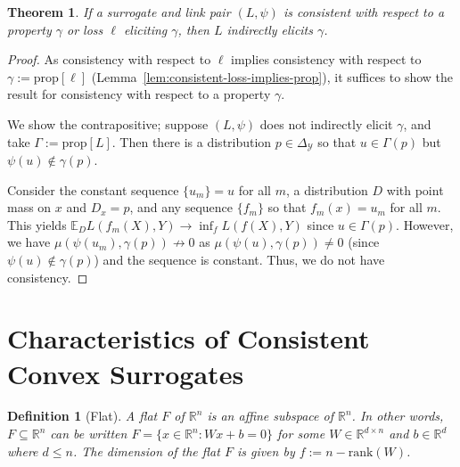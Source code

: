 \documentclass{article}
\newcommand{\reals}{\mathbb{R}}
\newcommand{\simplex}{\Delta_\Y}
\newcommand{\prop}[1]{\mathrm{prop}[#1]}
\newcommand{\E}{\mathbb{E}}
\newcommand{\Y}{\mathcal{Y}}
\newtheorem{theorem}{Theorem}
\newtheorem{definition}{Definition}
\begin{document}
\begin{theorem}\label{thm:consistent-implies-indir-elic}
	If a surrogate and link pair $(L, \psi)$ is consistent with respect to a property $\gamma$ or loss $\ell$ eliciting $\gamma$, then $L$ indirectly elicits $\gamma$.
\end{theorem}
\begin{proof}
	As consistency with respect to $\ell$ implies consistency with respect to $\gamma := \prop{\ell}$ (Lemma~\ref{lem:consistent-loss-implies-prop}), it suffices to show the result for consistency with respect to a property $\gamma$.
	
	We show the contrapositive; suppose $(L, \psi)$ does not indirectly elicit $\gamma$, and take $\Gamma := \prop{L}$.
	Then there is a distribution $p \in \simplex$ so that $u \in \Gamma(p)$ but $\psi(u) \not \in \gamma(p)$.

	Consider the constant sequence $\{u_m\} = u$ for all $m$, a distribution $D$ with point mass on $x$ and $D_x = p$, and any sequence $\{f_m\}$ so that $f_m(x) = u_m$ for all $m$.
	This yields $\E_D L(f_m(X), Y) \to \inf_f L(f(X),Y)$ since $u \in \Gamma(p)$.
	However, we have $\mu(\psi(u_m), \gamma(p)) \not \to 0$ as $\mu(\psi(u), \gamma(p)) \neq 0$ (since $\psi(u) \not \in \gamma(p)$) and the sequence is constant.
	Thus, we do not have consistency.
\end{proof}

\section{Characteristics of Consistent Convex Surrogates}\label{sec:char-convex}

\begin{definition}[Flat]
	A \emph{flat} $F$ of $\reals^n$ is an affine subspace of $\reals^n$.
	In other words, $F\subseteq \reals^n$ can be written $F=\{x\in\reals^n : Wx + b = 0\}$ for some $W\in\reals^{d\times n}$ and $b\in\reals^d$ where $d\leq n$.
	The dimension of the flat $F$ is given by $f := n - \mathrm{rank}(W)$.
\end{definition}
\end{document}
